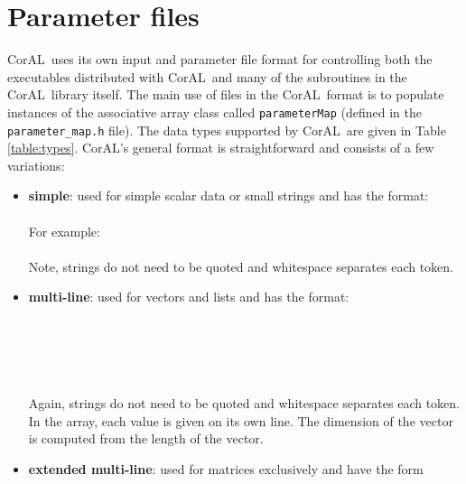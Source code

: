 \documentclass[10pt]{article}
\newcommand{\coral}{CorAL}
\begin{document}
\section{Parameter files}
\coral \ uses its own input and parameter file format for controlling both the executables distributed with \coral \ and many of the subroutines in the \coral \ library itself.  The main use of files in the \coral \ format is to populate instances of the associative array class called {\tt parameterMap} (defined in the {\tt parameter\_map.h} file).  The data types supported by \coral \ are given in Table \ref{table:types}.  \coral's general format is straightforward and consists of a few variations:
\begin{itemize}
	\item {\bf simple}: used for simple scalar data or small strings and has the format:\\
			\hspace*{0.25 in}{\tt type   name   value}\\
	For example:\\
			\\
	Note, strings do not need to be quoted and whitespace separates each token.
	\item {\bf multi-line}: used for vectors and lists and has the format:\\
			\\
			\hspace*{0.5 in}{\tt value0}\\
			\hspace*{0.5 in}{\tt value1}\\
			\hspace*{0.5 in}{\tt ...}\\
			\hspace*{0.25 in}{\tt \}}\\
	Again, strings do not need to be quoted and whitespace separates each token.  In the array, each value is given on its own line.  The dimension of the vector is computed from the length of the vector.
	\item {\bf extended multi-line}: used for matrices exclusively and have the form\\

\end{itemize}
\end{document}
